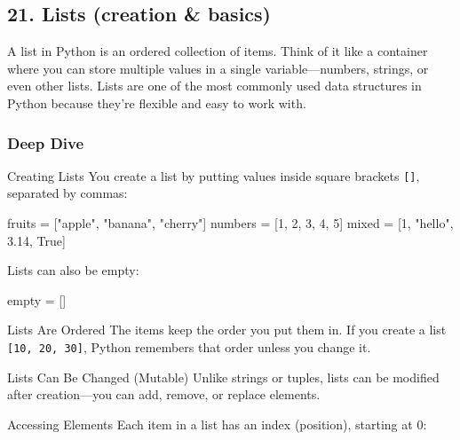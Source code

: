 \documentclass[
  letterpaper,
  DIV=11,
  numbers=noendperiod]{scrreprt}
\newenvironment{Shaded}{\begin{snugshade}}{\end{snugshade}}
\newcommand{\DecValTok}[1]{\textcolor[rgb]{0.68,0.00,0.00}{#1}}
\newcommand{\FloatTok}[1]{\textcolor[rgb]{0.68,0.00,0.00}{#1}}
\newcommand{\NormalTok}[1]{\textcolor[rgb]{0.00,0.23,0.31}{#1}}
\newcommand{\OperatorTok}[1]{\textcolor[rgb]{0.37,0.37,0.37}{#1}}
\newcommand{\StringTok}[1]{\textcolor[rgb]{0.13,0.47,0.30}{#1}}
\newcommand{\VariableTok}[1]{\textcolor[rgb]{0.07,0.07,0.07}{#1}}
\begin{document}
\subsection{21. Lists (creation \& basics)}\label{lists-creation-basics}

A list in Python is an ordered collection of items. Think of it like a
container where you can store multiple values in a single
variable---numbers, strings, or even other lists. Lists are one of the
most commonly used data structures in Python because they're flexible
and easy to work with.

\subsubsection{Deep Dive}\label{deep-dive-21}

Creating Lists You create a list by putting values inside square
brackets \texttt{{[}{]}}, separated by commas:

\begin{Shaded}
\begin{Highlighting}[]
\NormalTok{fruits }\OperatorTok{=}\NormalTok{ [}\StringTok{"apple"}\NormalTok{, }\StringTok{"banana"}\NormalTok{, }\StringTok{"cherry"}\NormalTok{]}
\NormalTok{numbers }\OperatorTok{=}\NormalTok{ [}\DecValTok{1}\NormalTok{, }\DecValTok{2}\NormalTok{, }\DecValTok{3}\NormalTok{, }\DecValTok{4}\NormalTok{, }\DecValTok{5}\NormalTok{]}
\NormalTok{mixed }\OperatorTok{=}\NormalTok{ [}\DecValTok{1}\NormalTok{, }\StringTok{"hello"}\NormalTok{, }\FloatTok{3.14}\NormalTok{, }\VariableTok{True}\NormalTok{]}
\end{Highlighting}
\end{Shaded}

Lists can also be empty:

\begin{Shaded}
\begin{Highlighting}[]
\NormalTok{empty }\OperatorTok{=}\NormalTok{ []}
\end{Highlighting}
\end{Shaded}

Lists Are Ordered The items keep the order you put them in. If you
create a list \texttt{{[}10,\ 20,\ 30{]}}, Python remembers that order
unless you change it.

Lists Can Be Changed (Mutable) Unlike strings or tuples, lists can be
modified after creation---you can add, remove, or replace elements.

Accessing Elements Each item in a list has an index (position), starting
at 0:
\end{document}
